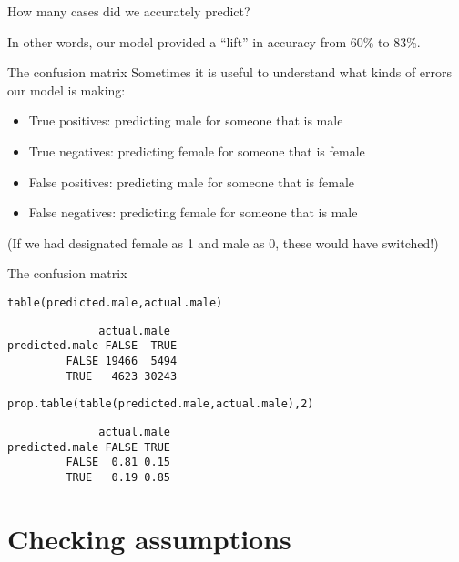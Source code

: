 \documentclass{beamer}\usepackage[]{graphicx}\usepackage[]{color}
\makeatletter
\newcommand{\hlnum}[1]{\textcolor[rgb]{0.824,0.412,0.118}{#1}}%
\newcommand{\hlstd}[1]{\textcolor[rgb]{1,0.894,0.769}{#1}}%
\newcommand{\hlkwd}[1]{\textcolor[rgb]{1,0.78,0.769}{#1}}%
\newenvironment{kframe}{%
 \def\at@end@of@kframe{}%
 \ifinner\ifhmode%
  \def\at@end@of@kframe{\end{minipage}}%
  \begin{minipage}{\columnwidth}%
 \fi\fi%
 \def\FrameCommand##1{\hskip\@totalleftmargin \hskip-\fboxsep
 \colorbox{shadecolor}{##1}\hskip-\fboxsep
     \hskip-\linewidth \hskip-\@totalleftmargin \hskip\columnwidth}%
 \MakeFramed {\advance\hsize-\width
   \@totalleftmargin\z@ \linewidth\hsize
   \@setminipage}}%
 {\par\unskip\endMakeFramed%
 \at@end@of@kframe}
\newenvironment{knitrout}{}{} %
\makeatother
\begin{document}
\begin{darkframes}
\begin{frame}[fragile]{How many cases did we accurately predict?}
      \pause

      In other words, our model provided a ``lift'' in accuracy from 60\% to 83\%.
    \end{frame}

    \begin{frame}{The confusion matrix}
      Sometimes it is useful to understand what kinds of errors our model is making:
      \begin{itemize}
        \item \alert{True positives}: predicting male for someone that is male
        \item \alert{True negatives}: predicting female for someone that is female
        \item \alert{False positives}: predicting male for someone that is female
        \item \alert{False negatives}: predicting female for someone that is male
      \end{itemize}
      (If we had designated female as 1 and male as 0, these would have switched!)
    \end{frame}

    \begin{frame}[fragile]{The confusion matrix}
\begin{knitrout}
\color{fgcolor}\begin{kframe}
\begin{alltt}
\hlkwd{table}\hlstd{(predicted.male, actual.male)}
\end{alltt}
\begin{verbatim}
              actual.male
predicted.male FALSE  TRUE
         FALSE 19466  5494
         TRUE   4623 30243
\end{verbatim}
\begin{alltt}
\hlkwd{prop.table}\hlstd{(}\hlkwd{table}\hlstd{(predicted.male, actual.male),} \hlnum{2}\hlstd{)}
\end{alltt}
\begin{verbatim}
              actual.male
predicted.male FALSE TRUE
         FALSE  0.81 0.15
         TRUE   0.19 0.85
\end{verbatim}
\end{kframe}
\end{knitrout}
    \end{frame}

    \section{Checking assumptions}


\end{darkframes}
\end{document}
